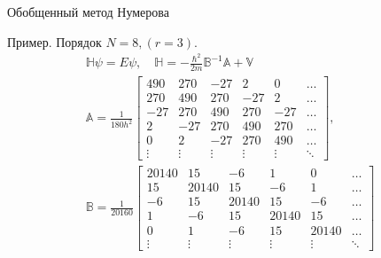 \documentclass[10pt,pdf,hyperref={unicode},xcolor=dvipsnames]{beamer}
\newcommand{\bbA}{\mathbb{A}}
\newcommand{\bbB}{\mathbb{B}}
\newcommand{\bbV}{\mathbb{V}}
\newcommand{\bbH}{\mathbb{H}}
\begin{document}
\begin{frame}{Обобщенный метод Нумерова}
    \begin{block}{Пример. Порядок $N = 8, (r = 3)$.}
        \vspace*{-0.5cm}
        \begin{gather}
            \bbH \psi = E \psi, \quad \bbH = -\frac{\hbar^2}{2m} \bbB^{-1} \bbA + \bbV \\
            \bbA = \frac{1}{180h^2}
            \begin{bmatrix}
                490 & 270 & -27 & 2 & 0 & \dots \\
                270 & 490 & 270 & -27 & 2 & \dots \\
                -27 & 270 & 490 & 270 & -27 & \dots \\
                  2 & -27 & 270 & 490 & 270 & \dots \\
                  0 & 2   & -27 & 270 & 490 & \dots \\
                  \vdots & \vdots & \vdots & \vdots & \vdots & \ddots
            \end{bmatrix}, \\
            \bbB = \frac{1}{20160}
            \begin{bmatrix}
                20140 & 15 & -6 & 1 & 0 & \dots \\
                15 & 20140 & 15 & -6 & 1 & \dots \\
                -6 & 15 & 20140 & 15 & -6 & \dots \\
                1 & -6 & 15 & 20140 & 15 & \dots \\
                0 & 1 & -6 & 15 & 20140 & \dots \\
                \vdots & \vdots & \vdots & \vdots & \vdots & \ddots
            \end{bmatrix}
        \end{gather}
    \end{block}
\end{frame}
\end{document}
